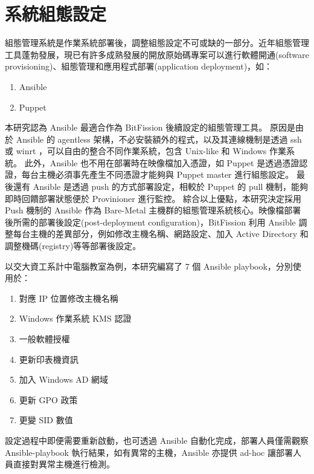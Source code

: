 \section{系統組態設定}
組態管理系統是作業系統部署後，調整組態設定不可或缺的一部分。近年組態管理工具蓬勃發展，現已有許多成熟發展的開放原始碼專案可以進行軟體開通(software provisioning)、組態管理和應用程式部署(application deployment)，如：
\begin{enumerate}
\item Ansible\cite{ansible}
\item Puppet\cite{puppet}
\end{enumerate}
本研究認為 Ansible 最適合作為 BitFission 後續設定的組態管理工具。
原因是由於 Ansible 的 agentless 架構，不必安裝額外的程式，以及其連線機制是透過 ssh 或 winrt ，可以自由的整合不同作業系統，包含 Unix-like 和 Windows 作業系統。
此外，Ansible 也不用在部署時在映像檔加入憑證，如 Puppet 是透過憑證認證，每台主機必須事先產生不同憑證才能夠與 Puppet master 進行組態設定。
最後還有 Ansible 是透過 push 的方式部署設定，相較於 Puppet 的 pull 機制，能夠即時回饋部署狀態便於 Provinioner 進行監控。
綜合以上優點，本研究決定採用 Push 機制的 Ansible 作為 Bare-Metal 主機群的組態管理系統核心。映像檔部署後所需的部署後設定(post-deployment configuration)，BitFission 利用 Ansible 調整每台主機的差異部分，例如修改主機名稱、網路設定、加入 Active Directory 和調整機碼(registry)等等部署後設定。

以交大資工系計中電腦教室為例，本研究編寫了 7 個 Ansible playbook，分別使用於：
\begin{enumerate}
\item 對應 IP 位置修改主機名稱
\item Windows 作業系統 KMS 認證
\item 一般軟體授權
\item 更新印表機資訊
\item 加入 Windows AD 網域
\item 更新 GPO 政策
\item 更變 SID 數值
\end{enumerate}
設定過程中即便需要重新啟動，也可透過 Ansible 自動化完成，部署人員僅需觀察 Ansible-playbook 執行結果，如有異常的主機，Ansible 亦提供 ad-hoc 讓部署人員直接對異常主機進行檢測。
